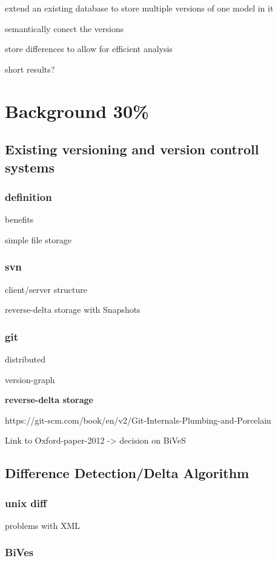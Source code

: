 \par extend an existing database to store multiple versions of one model in it
\par semantically conect the versions
\par store differences to allow for efficient analysis
\par short results?\section{Background 30\%}
\subsection{Existing versioning and version controll systems}
\subsubsection{definition}

\par benefits
\par simple file storage\subsubsection{svn}

\par client/server structure
\par reverse-delta storage with Snapshots\subsubsection{git}

\par distributed
\par version-graph\par \textbf{reverse-delta storage}

\par https://git-scm.com/book/en/v2/Git-Internals-Plumbing-and-Porcelain
\par Link to Oxford-paper-2012 -> decision on BiVeS\subsection{Difference Detection/Delta Algorithm}
\subsubsection{unix diff}

\par problems with XML\subsubsection{BiVes}

